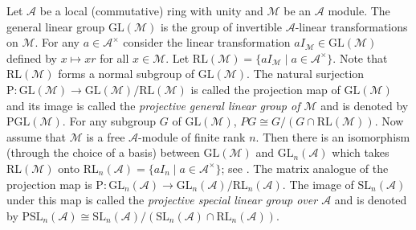 \documentclass[10pt,twoside]{amsart}
\newcommand{\GL}{\mathrm{GL}}
\newcommand{\SL}{\mathrm{SL}}
\theoremstyle{definition}
\theoremstyle{definition}
\begin{document}
Let $\mathcal{A}$ be a local (commutative) ring with unity and $\mathcal{M}$ be an $\mathcal{A}$ module. The general linear group $\GL(\mathcal{M})$ is the group of invertible $\mathcal{A}$-linear transformations on $\mathcal{M}$. For any $a\in \mathcal{A}^{\times}$ consider the linear transformation $aI_{\mathcal{M}}\in \GL(\mathcal{M})$ defined by $x\mapsto xr$ for all $x\in \mathcal{M}$. Let $\mathrm{RL}(\mathcal{M}) = \{aI_{\mathcal{M}} \mid a\in \mathcal{A}^{\times}\}$. Note that $\mathrm{RL}(\mathcal{M})$ forms a normal subgroup of $\GL(\mathcal{M})$. The natural surjection $\mathrm{P}\colon \GL(\mathcal{M}) \rightarrow \GL(\mathcal{M})/\mathrm{RL}(\mathcal{M})$ is called the projection map of $\GL(\mathcal{M})$ and its image is called the \emph{projective general linear group of $\mathcal{M}$} and is denoted by $\mathrm{PGL}(\mathcal{M})$. For any subgroup $G$ of $\GL(\mathcal{M})$, $PG\cong G/(G\cap \mathrm{RL}(\mathcal{M}))$. Now assume that $\mathcal{M}$ is a free $\mathcal{A}$-module of finite rank $n$. Then there is an isomorphism (through the choice of a basis) between $\GL(\mathcal{M})$ and $\GL_n(\mathcal{A})$ which takes $\mathrm{RL}(\mathcal{M})$ onto $\mathrm{RL}_n(\mathcal{A}) = \{aI_n \mid a\in \mathcal{A}^{\times}\}$; see \cite[section 1.2]{HahnOMeara}. The matrix analogue of the projection map is $\mathrm{P}\colon \GL_n(\mathcal{A}) \rightarrow \GL_n(\mathcal{A})/ \mathrm{RL}_n(\mathcal{A})$. The image of $\SL_n(\mathcal{A})$ under this map is called the \emph{ projective special linear group over $\mathcal{A}$} and is denoted by $\mathrm{PSL}_n(\mathcal{A}) \cong \SL_n(\mathcal{A})/(\SL_n(\mathcal{A})\cap \mathrm{RL}_n(\mathcal{A}))$. 
\end{document}
